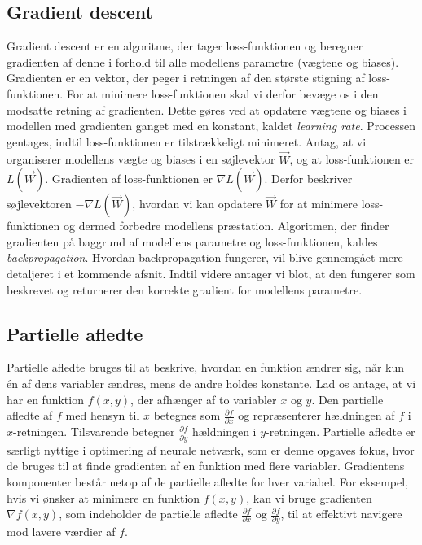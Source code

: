 \documentclass{article}
\begin{document}
\subsection{Gradient descent}
Gradient descent er en algoritme, der tager loss-funktionen og beregner gradienten af denne i forhold til alle modellens parametre (vægtene og biases). Gradienten er en vektor, der peger i retningen af den største stigning af loss-funktionen. For at minimere loss-funktionen skal vi derfor bevæge os i den modsatte retning af gradienten. Dette gøres ved at opdatere vægtene og biases i modellen med gradienten ganget med en konstant, kaldet \textit{learning rate}. Processen gentages, indtil loss-funktionen er tilstrækkeligt minimeret. \parencite{IBM_2021, Sanderson_2017, Nielsen_2019a} Antag, at vi organiserer modellens vægte og biases i en søjlevektor $\vec{W}$, og at loss-funktionen er $L(\vec{W})$. Gradienten af loss-funktionen er $\nabla L(\vec{W})$. Derfor beskriver søjlevektoren $-\nabla L(\vec{W})$, hvordan vi kan opdatere $\vec{W}$ for at minimere loss-funktionen og dermed forbedre modellens præstation. Algoritmen, der finder gradienten på baggrund af modellens parametre og loss-funktionen, kaldes \textit{backpropagation}. \parencite{Sanderson_2017, Nielsen_2019a} Hvordan backpropagation fungerer, vil blive gennemgået mere detaljeret i et kommende afsnit. Indtil videre antager vi blot, at den fungerer som beskrevet og returnerer den korrekte gradient for modellens parametre.

\subsection{Partielle afledte}
Partielle afledte bruges til at beskrive, hvordan en funktion ændrer sig, når kun én af dens variabler ændres, mens de andre holdes konstante. Lad os antage, at vi har en funktion $f(x, y)$, der afhænger af to variabler $x$ og $y$. Den partielle afledte af $f$ med hensyn til $x$ betegnes som $\frac{\partial f}{\partial x}$ og repræsenterer hældningen af $f$ i $x$-retningen. Tilsvarende betegner $\frac{\partial f}{\partial y}$ hældningen i $y$-retningen. Partielle afledte er særligt nyttige i optimering af neurale netværk, som er denne opgaves fokus, hvor de bruges til at finde gradienten af en funktion med flere variabler. Gradientens komponenter består netop af de partielle afledte for hver variabel. For eksempel, hvis vi ønsker at minimere en funktion $f(x, y)$, kan vi bruge gradienten $\nabla f(x, y)$, som indeholder de partielle afledte $\frac{\partial f}{\partial x}$ og $\frac{\partial f}{\partial y}$, til at effektivt navigere mod lavere værdier af $f$. \parencite{Kirsanov_2024}
\end{document}
